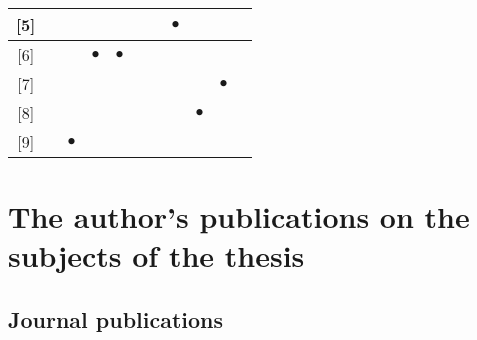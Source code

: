 \documentclass[12pt,a4paper]{extarticle}
\begin{document}
\begin{table}[h!]
\begin{tabular}{|c|c|c|c|c|c|c|c|c|c|c|}
{[}5{]}                               & \multicolumn{1}{c|}{}          & \multicolumn{1}{c|}{}          & \multicolumn{1}{c|}{}          & \multicolumn{1}{c|}{}          & \multicolumn{1}{c|}{}          & \multicolumn{1}{c|}{}          & \multicolumn{1}{c|}{$\bullet$} & \multicolumn{1}{c|}{}          &           \\ \hline
{[}6{]}                               & \multicolumn{1}{c|}{}          & \multicolumn{1}{c|}{}          & \multicolumn{1}{c|}{$\bullet$} & \multicolumn{1}{c|}{$\bullet$} & \multicolumn{1}{c|}{}          & \multicolumn{1}{c|}{}          & \multicolumn{1}{c|}{}          & \multicolumn{1}{c|}{}          &           \\ \hline
{[}7{]}                               & \multicolumn{1}{c|}{}          & \multicolumn{1}{c|}{}          & \multicolumn{1}{c|}{}          & \multicolumn{1}{c|}{}          & \multicolumn{1}{c|}{}          & \multicolumn{1}{c|}{}          & \multicolumn{1}{c|}{}          & \multicolumn{1}{c|}{}          & $\bullet$ \\ \hline
{[}8{]}                               & \multicolumn{1}{c|}{}          & \multicolumn{1}{c|}{}          & \multicolumn{1}{c|}{}          & \multicolumn{1}{c|}{}          & \multicolumn{1}{c|}{}          & \multicolumn{1}{c|}{}          & \multicolumn{1}{c|}{}          & \multicolumn{1}{c|}{$\bullet$} &           \\ \hline
{[}9{]}                               & \multicolumn{1}{c|}{}          & \multicolumn{1}{c|}{$\bullet$} & \multicolumn{1}{c|}{}          & \multicolumn{1}{c|}{}          & \multicolumn{1}{c|}{}          & \multicolumn{1}{c|}{}          & \multicolumn{1}{c|}{}          & \multicolumn{1}{c|}{}          &           \\ \hline
\end{tabular}
\end{table}

\newpage
\section*{The author’s publications on the subjects of the thesis}

\vspace*{1em}

\subsection*{Journal publications}
\end{document}
